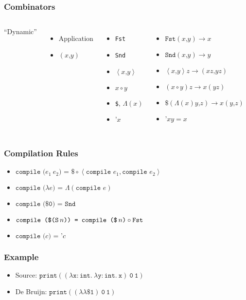 \documentclass[draft]{beamer}
\begin{document}
\begin{frame}
	\frametitle{Combinators}
	\begin{columns}[T]
		``Dynamic''
		\begin{itemize}
			\item<1-> Application
			\item<2-> $\left(x\texttt{,}y\right)$
		\end{itemize}
		\begin{itemize}
			\item<4-> \texttt{Fst}
			\item<4-> \texttt{Snd}
			\item<5-> $\left<x\texttt{,}y\right>$
			\item<6-> $x \circ y$
			\item<7-> \texttt{\$}, $\Lambda\left(x\right)$
			\item<8-> $\texttt{'}x$
		\end{itemize}

		\vspace{2.1cm}
		\begin{itemize}
			\item<4-> $\texttt{Fst}\left(x\texttt{,}y\right)\rightarrow x$
			\item<4-> $\texttt{Snd}\left(x\texttt{,}y\right)\rightarrow y$
			\item<5-> $\left<x\texttt{,}y\right>z\rightarrow\left(xz\texttt{,}yz\right)$
			\item<6-> $\left(x \circ y\right)z\rightarrow x\left(yz\right)$
			\item<7-> $\texttt{\$}\left(\Lambda\left(x\right)y\texttt{,}z\right)\rightarrow x\left(y\texttt{,}z\right)$
			\item<8-> $\texttt{'}xy = x$
		\end{itemize}
	\end{columns}
\end{frame}

\begin{frame}
	\frametitle{Compilation Rules}
	\begin{itemize}[<+->]
		\item $\texttt{compile (}e_1\ e_2\texttt{) = }\texttt{\$}\circ\left<\texttt{compile }e_1, \texttt{compile }e_2\right>$
		\item $\texttt{compile (}\lambda e\texttt{) = }\Lambda\left(\texttt{compile }e\right)$
		\item $\texttt{compile (\$0) = Snd}$
		\item $\texttt{compile (\$(S\,}n\texttt{)) = compile (\$\,}n\texttt{)}\circ\texttt{Fst}$
		\item $\texttt{compile (}c\texttt{) = '}c$
	\end{itemize}
\end{frame}

\begin{frame}
	\frametitle{Example}
	\begin{itemize}
		\item<1-> Source: $\mathtt{print \left(\left(\lambda x:int.\ \lambda y:int.\ x\right)\ 0\ 1\right)}$
		\item<2-> De Bruijn: $\mathtt{print \left(\left(\lambda\lambda\$1\right)\ 0\ 1\right)}$
	\end{itemize}
\end{frame}
\end{document}
